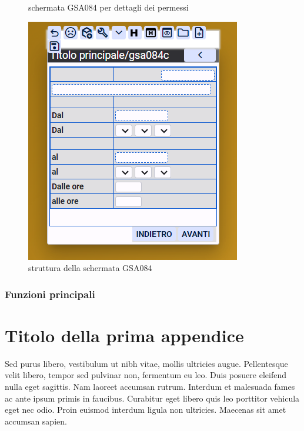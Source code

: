 \documentclass[target=bach,aauheader=,style=]{thud}
\begin{document}
\begin{figure}[h]
\begin{minipage}{0.3\textwidth}
        \caption{schermata GSA084 per dettagli dei permessi}
    \end{minipage}
    \hfill
    \begin{minipage}{0.3\textwidth}
        \centering
        \includegraphics[width=\linewidth]{screenshot/Struttura_gsa084.png}
        \caption{struttura della schermata GSA084}
    \end{minipage}
\end{figure}

\subsection{Funzioni principali}

\appendix


\chapter{Titolo della prima appendice}
Sed purus libero, vestibulum ut nibh vitae, mollis ultricies augue. Pellentesque velit libero, tempor sed pulvinar non, fermentum eu leo. Duis posuere eleifend nulla eget sagittis. Nam laoreet accumsan rutrum. Interdum et malesuada fames ac ante ipsum primis in faucibus. Curabitur eget libero quis leo porttitor vehicula eget nec odio. Proin euismod interdum ligula non ultricies. Maecenas sit amet accumsan sapien.
\end{document}
